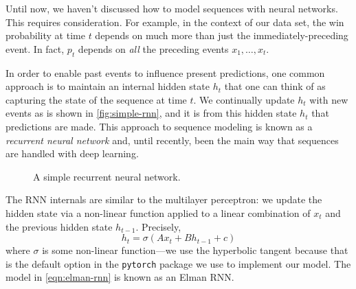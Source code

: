 Until now, we haven't discussed how to model sequences with neural networks. This requires consideration. For example, in the context of our data set, the win probability at time $t$ depends on much more than just the immediately-preceding event. In fact, $p_t$ depends on \emph{all} the preceding events $x_1, \ldots, x_t$.

In order to enable past events to influence present predictions, one common approach is to maintain an internal hidden state $h_t$ that one can think of as capturing the state of the sequence at time $t$. We continually update $h_t$ with new events as is shown in  \autoref{fig:simple-rnn}, and it is from this hidden state $h_t$ that predictions are made. This approach to sequence modeling is known as a \emph{recurrent neural network} and, until recently, been the main way that sequences are handled with deep learning.

\begin{figure}
	\centering

	\caption{A simple recurrent neural network.}
	\label{fig:simple-rnn}
\end{figure}

The RNN internals are similar to the multilayer perceptron: we update the hidden state via a non-linear function applied to a linear combination of $x_t$ and the previous hidden state $h_{t-1}$. Precisely,
\begin{equation}
	\label{eqn:elman-rnn}
	h_t = \sigma(A x_t + Bh_{t-1} + c)
\end{equation}
where $\sigma$ is some non-linear function---we use the hyperbolic tangent because that is the default option in the \texttt{pytorch} package we use to implement our model. The model in \autoref{eqn:elman-rnn} is known as an Elman RNN.

